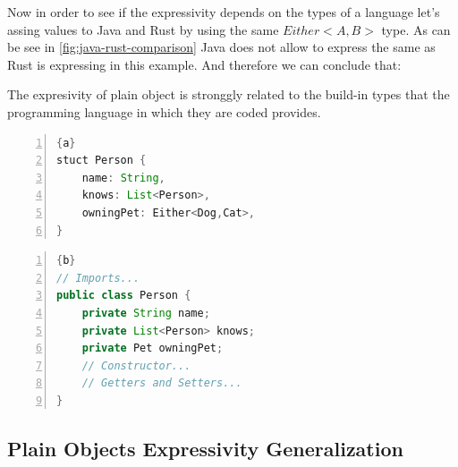 Now in order to see if the expressivity depends on the types of a language let's assing values to Java and Rust by using the same
$Either<A,B>$ type. As can be see in \cref{fig:java-rust-comparison} Java does not allow to express the same as Rust is expressing
in this example. And therefore we can conclude that:

\begin{partconclusion}
    The expresivity of plain object is stronggly related to the build-in types that the programming language in which they are coded
    provides.
\end{partconclusion}

\begin{center}
	\noindent\begin{minipage}[t]{.4\textwidth}
        \begin{lstlisting}[language=Java,frame=topline,numbers=left,title=\scriptsize{Person Rust Struct},
            basicstyle=\ttfamily\scriptsize]{a}
stuct Person {
    name: String,
    knows: List<Person>,
    owningPet: Either<Dog,Cat>,
}
		\end{lstlisting}
	\end{minipage}\hfill
	\begin{minipage}[t]{.5\textwidth}
        \begin{lstlisting}[language=Java, frame=t,numbers=left,title=\scriptsize{Person Java Object},
            basicstyle=\ttfamily\scriptsize]{b}
// Imports...
public class Person {
    private String name;
    private List<Person> knows;
    private Pet owningPet;
    // Constructor...
    // Getters and Setters...
}
		\end{lstlisting}
	\end{minipage}
	\label{fig:java-rust-comparison}
\end{center}


\subsection{Plain Objects Expressivity Generalization}

